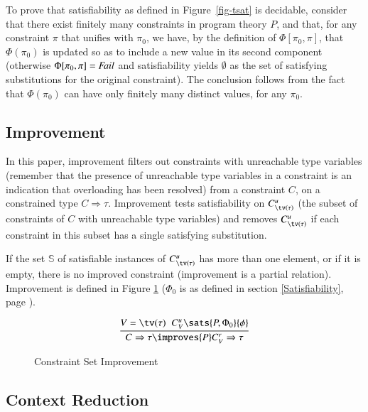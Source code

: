 \documentclass[review]{elsarticle}
\begin{document}
To prove that satisfiability as defined in Figure~\ref{fig-tsat} is
decidable, consider that there exist finitely many constraints in
program theory $P$, and that, for any constraint $\pi$ that unifies
with $\pi_0$, we have, by the definition of $\Phi[\pi_0,\pi]$, that
$\Phi(\pi_0)$ is updated so as to include a new value in its second
component (otherwise $\Phi[\pi_0,\pi] = \text{\it Fail\/}$ and
satisfiability yields $\emptyset$ as the set of satisfying
substitutions for the original constraint). The conclusion follows
from the fact that $\Phi(\pi_0)$ can have only finitely many distinct
values, for any $\pi_0$.

\subsection{Improvement}
\label{Improvement}

In this paper, improvement filters out constraints with unreachable
type variables (remember that the presence of unreachable type
variables in a constraint is an indication that overloading has been
resolved) from a constraint $C$, on a constrained type $C\Rightarrow
\tau$. Improvement tests satisfiability on $C_{\tv(\tau)}^u$ (the
subset of constraints of $C$ with unreachable type variables) and
removes $C_{\tv(\tau)}^u$ if each constraint in this subset has a
single satisfying substitution.


If the set $\mathbb{S}$ of satisfiable instances of $C_{\tv(\tau)}^u$
has more than one element, or if it is empty, there is no improved
constraint (improvement is a partial relation).
Improvement is defined in Figure \ref{Constraint-set-improvement}
($\Phi_0$ is as defined in section \ref{Satisfiability}, page
\pageref{Phi0}).

\begin{figure}
   \[ \displaystyle \frac{V = \tv(\tau) \hspace*{.2cm} C_V^u \sats {P,\Phi_0} \{ \phi \}}
                         {C \Rightarrow \tau \improves {P} C_V^r \Rightarrow \tau}  \]
\caption{Constraint Set Improvement}
\label{Constraint-set-improvement}
\end{figure}

\subsection{Context Reduction}
\label{Context-Reduction}
\end{document}
